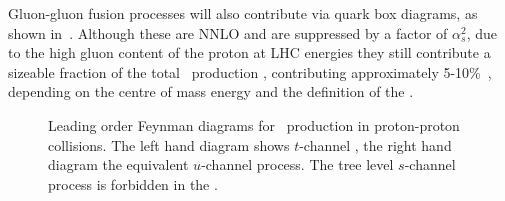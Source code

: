 Gluon-gluon fusion processes will also
contribute via quark box diagrams, as shown in~. Although
these are NNLO and are suppressed by a factor of
$\alpha_s^2$, due to the high gluon content of the proton at LHC energies they
still contribute a sizeable fraction of the total \ZZ\ production \cx,
contributing approximately 5-10\%~\cite{Campbell:2011},
depending on the centre of mass energy and the definition of the \cx.

\begin{figure}
\centering
    \hspace{10mm}
        \vspace{8mm}
\caption[Leading order Feynman diagrams for \ZZ\ production in proton-proton
collisions.]{Leading order Feynman diagrams for \ZZ\ production in proton-proton
collisions. The left hand diagram shows $t$-channel \qqZZ, the right hand
diagram the equivalent $u$-channel process. The tree level $s$-channel process is forbidden
in the \sm.}
\label{fig:theoryzz-fd-qqZZ}
\end{figure}

